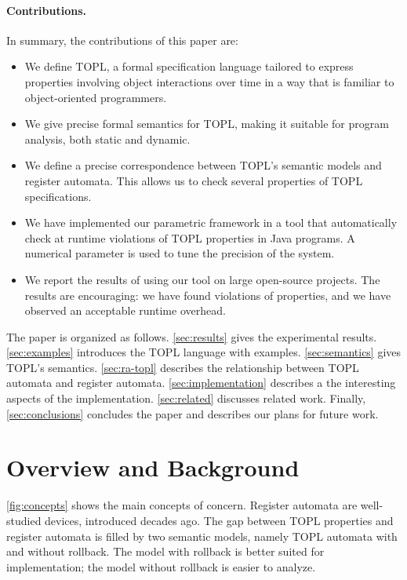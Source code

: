\documentclass[9pt, preprint]{sigplanconf} %
\theoremstyle{definition}
\theoremstyle{remark}
\begin{document}
\paragraph{Contributions.}
In summary, the contributions of this paper are:
\begin{itemize}
\item We define TOPL, a formal specification language tailored to express properties involving object interactions over time in a way that is familiar to object-oriented programmers.
\item We give precise formal semantics for TOPL, making it suitable for program analysis, both static and dynamic.
\item We define a precise correspondence between TOPL's semantic models and register automata. This allows us to check several properties of TOPL specifications.
\item We have implemented our parametric framework  in a tool that automatically check at runtime violations of TOPL properties in Java programs. A numerical parameter is used to tune the precision of the system.

\item We report the results of using our tool on large open-source projects. The results are encouraging: we have found
violations of properties, and we have observed an acceptable runtime overhead. 
\end{itemize}


The paper is organized as follows.
\autoref{sec:results} gives the experimental results.
\autoref{sec:examples} introduces the TOPL language with examples.
\autoref{sec:semantics} gives TOPL's semantics.
\autoref{sec:ra-topl} describes the relationship between TOPL automata and register automata.
\autoref{sec:implementation} describes a the interesting aspects of the implementation.
\autoref{sec:related} discusses related work.
Finally, \autoref{sec:conclusions} concludes the paper and describes our plans for future work.

\section{Overview and Background}\label{sec:overview} %

\autoref{fig:concepts} shows the main concepts of concern.
Register automata are well-studied devices, introduced decades ago.
The gap between TOPL properties and register automata is filled by two semantic models, namely TOPL automata with and without rollback.
The model with rollback is better suited for implementation;
the model without rollback is easier to analyze.
\end{document}
